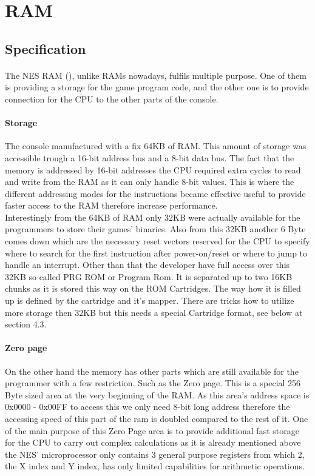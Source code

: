 \documentclass[]{report}
\begin{document}
\section{RAM}

\subsection{Specification}
\paragraph{ }
The NES RAM (\cite{NSRM}), unlike RAMs nowadays, fulfils multiple purpose. One of them is providing a storage for the game program code, and the other one is to provide connection for the CPU to the other parts of the console.
\paragraph{Storage}
The console manufactured with a fix 64KB of RAM. This amount of storage was accessible trough a 16-bit address bus and a 8-bit data bus. The fact that the memory is addressed by 16-bit addresses the CPU required extra cycles to read and write from the RAM as it can only handle 8-bit values. This is where the different addressing modes for the instructions became effective useful to provide faster access to the RAM therefore increase performance.
\\
 Interestingly from the 64KB of RAM only 32KB were actually  available for the programmers to store their games' binaries. Also from this 32KB another 6 Byte comes down which are the necessary reset vectors reserved for the CPU to specify where to search for the first instruction after power-on/reset or where to jump to handle an interrupt. Other than that the developer have full access over this 32KB so called PRG ROM or Program Rom. It is separated up to two 16KB chunks as it is stored this way on the ROM Cartridges. The way how it is filled up is defined by the cartridge and it's mapper. There are tricks how to utilize more storage then 32KB but this needs a special Cartridge format, see below at section 4.3. 
 
 \paragraph{Zero page}
 On the other hand the memory has other parts which are still available for the programmer with a few restriction. Such as the Zero page. This is a special 256 Byte sized area at the very beginning of the RAM.
 As this area's address space is 0x0000 - 0x00FF to access this we only need 8-bit long address therefore the accessing speed of this part of the ram is doubled compared to the rest of it. One of the main purpose of this Zero Page area is to provide additional fast storage for the CPU to carry out complex calculations as it is already mentioned above the NES' microprocessor only contains 3 general purpose registers from which 2, the X index and Y index, has only limited capabilities for arithmetic operations.
 
\end{document}
